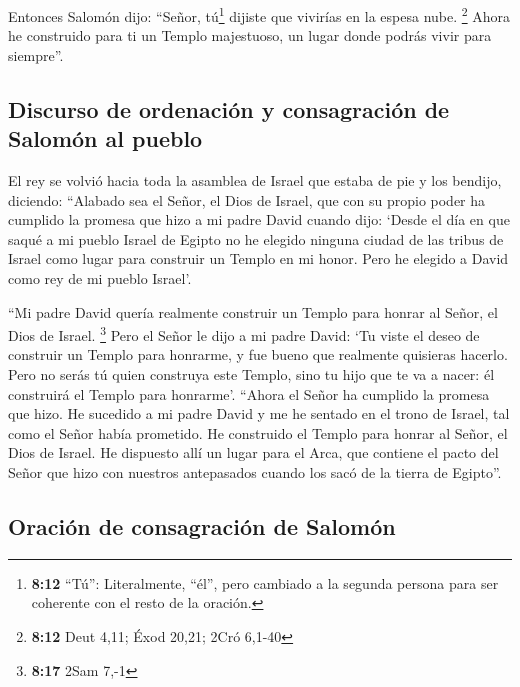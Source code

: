  Entonces Salomón dijo: ``Señor, tú\footnote{\textbf{8:12}
  ``Tú'': Literalmente, ``él'', pero cambiado a la segunda persona para
  ser coherente con el resto de la oración.} dijiste que vivirías en la
espesa nube. \footnote{\textbf{8:12} Deut 4,11; Éxod 20,21; 2Cró 6,1-40}
 Ahora he construido para ti un Templo majestuoso, un
lugar donde podrás vivir para siempre''.

\hypertarget{discurso-de-ordenaciuxf3n-y-consagraciuxf3n-de-salomuxf3n-al-pueblo}{%
\subsection{Discurso de ordenación y consagración de Salomón al
pueblo}\label{discurso-de-ordenaciuxf3n-y-consagraciuxf3n-de-salomuxf3n-al-pueblo}}

 El rey se volvió hacia toda la asamblea de Israel que
estaba de pie y los bendijo,  diciendo: ``Alabado sea el
Señor, el Dios de Israel, que con su propio poder ha cumplido la promesa
que hizo a mi padre David cuando dijo:  `Desde el día en
que saqué a mi pueblo Israel de Egipto no he elegido ninguna ciudad de
las tribus de Israel como lugar para construir un Templo en mi honor.
Pero he elegido a David como rey de mi pueblo Israel'.

 ``Mi padre David quería realmente construir un Templo
para honrar al Señor, el Dios de Israel. \footnote{\textbf{8:17} 2Sam
  7,-1}  Pero el Señor le dijo a mi padre David: `Tu
viste el deseo de construir un Templo para honrarme, y fue bueno que
realmente quisieras hacerlo.  Pero no serás tú quien
construya este Templo, sino tu hijo que te va a nacer: él construirá el
Templo para honrarme'.  ``Ahora el Señor ha cumplido la
promesa que hizo. He sucedido a mi padre David y me he sentado en el
trono de Israel, tal como el Señor había prometido. He construido el
Templo para honrar al Señor, el Dios de Israel.  He
dispuesto allí un lugar para el Arca, que contiene el pacto del Señor
que hizo con nuestros antepasados cuando los sacó de la tierra de
Egipto''.

\hypertarget{oraciuxf3n-de-consagraciuxf3n-de-salomuxf3n}{%
\subsection{Oración de consagración de
Salomón}\label{oraciuxf3n-de-consagraciuxf3n-de-salomuxf3n}}

